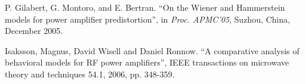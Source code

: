 \documentclass[a4paper,
               keeplastbox,%
               nospread%
              ]{jacow}
\begin{document}
\begin{thebibliography}{99}
	
	P. Gilabert, G. Montoro, and E. Bertran. ``On the Wiener and Hammerstein models for power amplifier predistortion”, 
	in \textit{Proc. APMC’05}, Suzhou, China, December 2005.
	
	Isaksson, Magnus, David Wisell and Daniel Ronnow. ``A comparative analysis of behavioral models for RF power amplifiers”,
	IEEE transactions on microwave theory and techniques 54.1, 2006, pp. 348-359.
	

	
\end{thebibliography}

\null 
\end{document}
